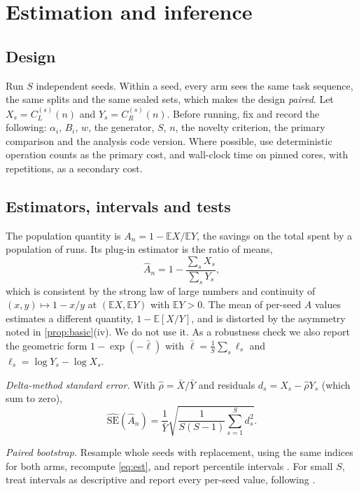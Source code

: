\documentclass[11pt]{article}
\theoremstyle{remark}
\newcommand{\E}{\mathbb{E}}
\begin{document}
\section{Estimation and inference}\label{sec:stats}

\subsection{Design}
Run $S$ independent seeds.
Within a seed, every arm sees the same task sequence, the same splits and the same sealed sets, which makes the design \emph{paired}.
Let $X_s = C_L^{(s)}(n)$ and $Y_s = C_R^{(s)}(n)$.
Before running, fix and record the following: $\alpha_i$, $B_i$, $w$, the generator, $S$, $n$, the novelty criterion, the primary comparison and the analysis code version.
Where possible, use deterministic operation counts as the primary cost, and wall-clock time on pinned cores, with repetitions, as a secondary cost.

\subsection{Estimators, intervals and tests}\label{sec:est}
The population quantity is $A_n = 1-\E X/\E Y$, the savings on the total spent by a population of runs. Its plug-in estimator is the ratio of means,
\begin{equation}\label{eq:est}
\hat A_n = 1-\frac{\sum_s X_s}{\sum_s Y_s},
\end{equation}
which is consistent by the strong law of large numbers and continuity of $(x,y)\mapsto 1-x/y$ at $(\E X,\E Y)$ with $\E Y>0$.
The mean of per-seed $A$ values estimates a different quantity, $1-\E[X/Y]$, and is distorted by the asymmetry noted in \cref{prop:basic}(iv). We do not use it.
As a robustness check we also report the geometric form $1-\exp(-\bar\ell)$ with $\bar\ell = \frac1S\sum_s \ell_s$ and $\ell_s=\log Y_s-\log X_s$.

\emph{Delta-method standard error.} With $\hat\rho = \bar X/\bar Y$ and residuals $d_s = X_s-\hat\rho Y_s$ (which sum to zero),
\begin{equation}\label{eq:se}
\widehat{\mathrm{SE}}(\hat A_n) = \frac{1}{\bar Y}\sqrt{\frac{1}{S(S-1)}\sum_{s=1}^S d_s^2 } .
\end{equation}

\emph{Paired bootstrap.} Resample whole seeds with replacement, using the same indices for both arms, recompute \eqref{eq:est}, and report percentile intervals \citep{efron1993bootstrap}.
For small $S$, treat intervals as descriptive and report every per-seed value, following \citet{agarwal2021deep}.
\end{document}
